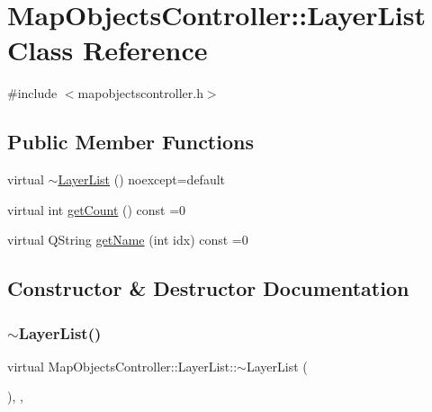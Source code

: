 \hypertarget{class_map_objects_controller_1_1_layer_list}{}\section{Map\+Objects\+Controller\+::Layer\+List Class Reference}
\label{class_map_objects_controller_1_1_layer_list}


{\ttfamily \#include $<$mapobjectscontroller.\+h$>$}

\subsection*{Public Member Functions}
\begin{DoxyCompactItemize}
\item 
virtual \mbox{\hyperlink{class_map_objects_controller_1_1_layer_list_a770250c6b46e0ada3ffb173ee04ca22b}{$\sim$\+Layer\+List}} () noexcept=default
\item 
virtual int \mbox{\hyperlink{class_map_objects_controller_1_1_layer_list_a0f70c2fae48c5054a11c4c79762cca1f}{get\+Count}} () const =0
\item 
virtual Q\+String \mbox{\hyperlink{class_map_objects_controller_1_1_layer_list_a96858a1defaf842f18563bb5a7c594cf}{get\+Name}} (int idx) const =0
\end{DoxyCompactItemize}


\subsection{Constructor \& Destructor Documentation}
\mbox{\label{class_map_objects_controller_1_1_layer_list_a770250c6b46e0ada3ffb173ee04ca22b}} 
\subsubsection{\texorpdfstring{$\sim$LayerList()}{~LayerList()}}
{\footnotesize\ttfamily virtual Map\+Objects\+Controller\+::\+Layer\+List\+::$\sim$\+Layer\+List (\begin{DoxyParamCaption}{ }\end{DoxyParamCaption})\hspace{0.3cm}{\ttfamily [virtual]}, {\ttfamily [default]}, {\ttfamily [noexcept]}}



